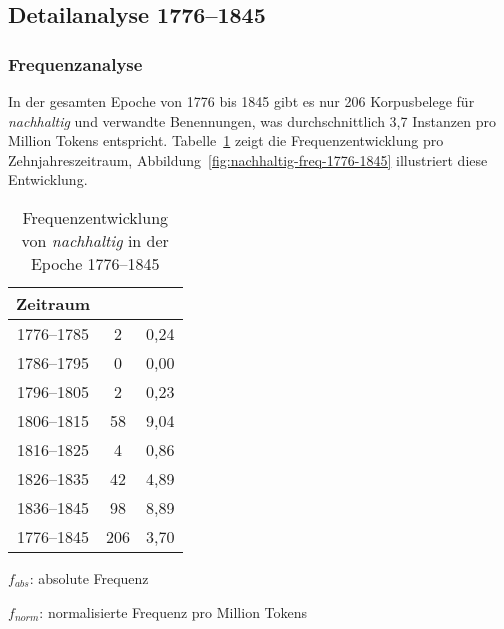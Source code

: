 \documentclass[
    german,
    a4paper,%
    12pt,%
    oneside,%
    toc=bibliography,
    final,
]{scrartcl}
\begin{document}
\subsection{Detailanalyse 1776–1845}
\label{subsec:detail-1776–1845}

\subsubsection{Frequenzanalyse}

In der gesamten Epoche von 1776 bis 1845 gibt es nur 206 Korpusbelege für \textit{nachhaltig} und verwandte Benennungen, was durchschnittlich 3,7 Instanzen pro Million Tokens entspricht. Tabelle~\ref{tab:freq-epoche1} zeigt die Frequenzentwicklung pro Zehnjahreszeitraum, Abbildung~\ref{fig:nachhaltig-freq-1776-1845} illustriert diese Entwicklung.

\begin{table}[h!]
	\centering
	\renewcommand{\arraystretch}{1.5}
	
	\caption{Frequenzentwicklung von \textit{nachhaltig} in der Epoche 1776–1845}
	\label{tab:freq-epoche1}
	
	\begin{threeparttable}
	
	\begin{tabular}{ccc}
	\textbf{Zeitraum} & \boldmath{$f_{abs}$} & \boldmath{$f_{norm}$} \\ \hline
	1776–1785 & 2 & 0,24 \\ \hline
	1786–1795 & 0 & 0,00 \\ \hline
	1796–1805 & 2 & 0,23 \\ \hline
	1806–1815 & 58 & 9,04 \\ \hline
	1816–1825 & 4 & 0,86 \\ \hline
	1826–1835 & 42 & 4,89 \\ \hline
	1836–1845 & 98 & 8,89 \\ \hline\hline
	1776–1845 & 206 & 3,70 \\ \hline
	\end{tabular} 
	
	\begin{tablenotes}
	\footnotesize
	\setlength{\itemindent}{-1.2em}
	\item $f_{abs}$: absolute Frequenz
	\item $f_{norm}$: normalisierte Frequenz pro Million Tokens
	\end{tablenotes}
	
	\end{threeparttable}
\end{table}
\end{document}
